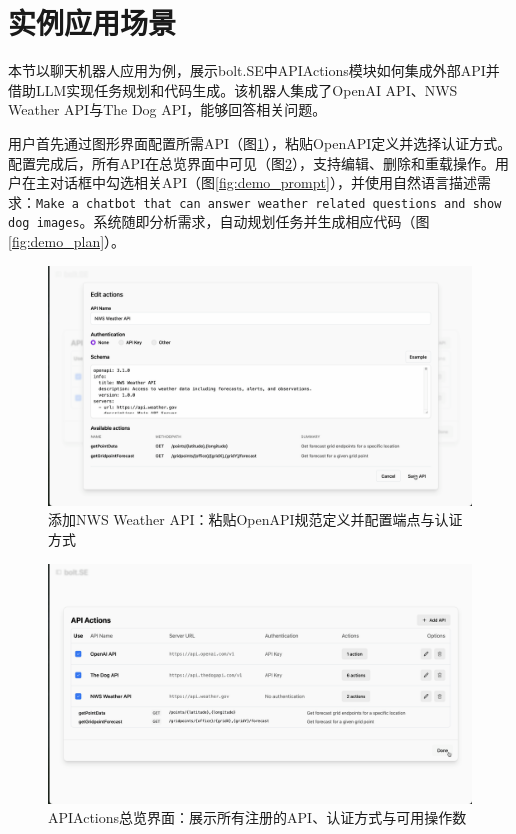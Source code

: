 \section{实例应用场景}

本节以聊天机器人应用为例，展示bolt.SE中APIActions模块如何集成外部API并借助LLM实现任务规划和代码生成。该机器人集成了OpenAI API、NWS Weather API与The Dog API，能够回答相关问题。

用户首先通过图形界面配置所需API（图\ref{fig:demo_edit}），粘贴OpenAPI定义并选择认证方式。配置完成后，所有API在总览界面中可见（图\ref{fig:demo_table}），支持编辑、删除和重载操作。用户在主对话框中勾选相关API（图\ref{fig:demo_prompt}），并使用自然语言描述需求：\texttt{Make a chatbot that can answer weather related questions and show dog images}。系统随即分析需求，自动规划任务并生成相应代码（图\ref{fig:demo_plan}）。

\begin{figure}
  \centering
  \includegraphics[width=\textwidth]{figures/screenshots/api-actions/demo_edit_modal.png}
  \caption{添加NWS Weather API：粘贴OpenAPI规范定义并配置端点与认证方式}
  \label{fig:demo_edit}
\end{figure}

\begin{figure}
  \centering
  \includegraphics[width=\textwidth]{figures/screenshots/api-actions/demo_actions_table.png}
  \caption{APIActions总览界面：展示所有注册的API、认证方式与可用操作数}
  \label{fig:demo_table}
\end{figure}

